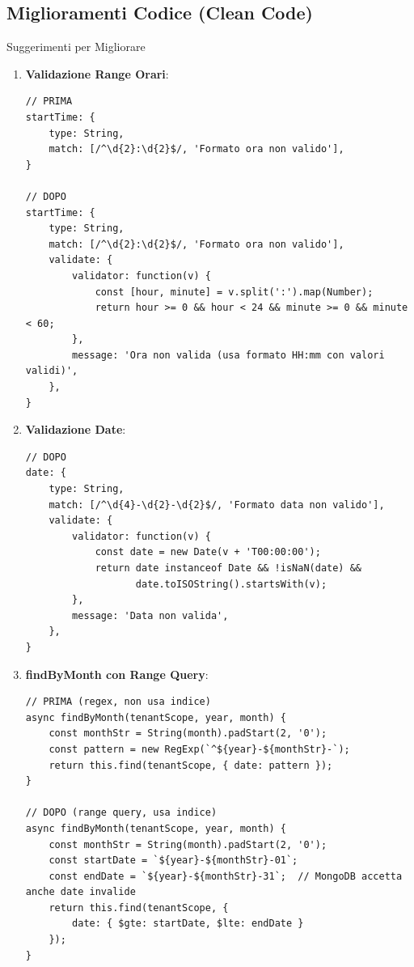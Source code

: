 \documentclass[11pt,a4paper]{article}
\begin{document}
\subsection{Miglioramenti Codice (Clean Code)}

\begin{tipbox}{Suggerimenti per Migliorare}
\end{tipbox}

\begin{enumerate}
    \item \textbf{Validazione Range Orari}:
    \begin{lstlisting}
// PRIMA
startTime: { 
    type: String, 
    match: [/^\d{2}:\d{2}$/, 'Formato ora non valido'],
}

// DOPO
startTime: { 
    type: String, 
    match: [/^\d{2}:\d{2}$/, 'Formato ora non valido'],
    validate: {
        validator: function(v) {
            const [hour, minute] = v.split(':').map(Number);
            return hour >= 0 && hour < 24 && minute >= 0 && minute < 60;
        },
        message: 'Ora non valida (usa formato HH:mm con valori validi)',
    },
}
    \end{lstlisting}
    
    \item \textbf{Validazione Date}:
    \begin{lstlisting}
// DOPO
date: { 
    type: String, 
    match: [/^\d{4}-\d{2}-\d{2}$/, 'Formato data non valido'],
    validate: {
        validator: function(v) {
            const date = new Date(v + 'T00:00:00');
            return date instanceof Date && !isNaN(date) && 
                   date.toISOString().startsWith(v);
        },
        message: 'Data non valida',
    },
}
    \end{lstlisting}
    
    \item \textbf{findByMonth con Range Query}:
    \begin{lstlisting}
// PRIMA (regex, non usa indice)
async findByMonth(tenantScope, year, month) {
    const monthStr = String(month).padStart(2, '0');
    const pattern = new RegExp(`^${year}-${monthStr}-`);
    return this.find(tenantScope, { date: pattern });
}

// DOPO (range query, usa indice)
async findByMonth(tenantScope, year, month) {
    const monthStr = String(month).padStart(2, '0');
    const startDate = `${year}-${monthStr}-01`;
    const endDate = `${year}-${monthStr}-31`;  // MongoDB accetta anche date invalide
    return this.find(tenantScope, { 
        date: { $gte: startDate, $lte: endDate } 
    });
}
    \end{lstlisting}
    

\end{enumerate}
\end{document}
